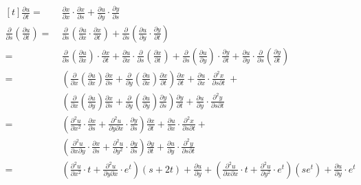 $\begin{aligned}[t]
    \frac{\partial u}{\partial t} 
    =&~ \frac{\partial x}{\partial x} \cdot \frac{\partial x}{\partial s} + \frac{\partial u}{\partial y} \cdot \frac{\partial y}{\partial s} \\
    \frac{\partial}{\partial s} \left( \frac{\partial u}{\partial t} \right) 
    =&~ \frac{\partial}{\partial s} \left( \frac{\partial u}{\partial x} \cdot \frac{\partial x}{\partial t} \right) + \frac{\partial}{\partial s} \left( \frac{\partial u}{\partial y} \cdot \frac{\partial y}{\partial t} \right) \\
    =&~ \frac{\partial}{\partial s} \left( \frac{\partial u}{\partial x} \right) \cdot \frac{\partial x}{\partial t} + \frac{\partial u}{\partial x} \cdot \frac{\partial}{\partial s} \left( \frac{\partial x}{\partial t} \right) + \frac{\partial}{\partial s} \left( \frac{\partial u}{\partial y} \right) \cdot \frac{\partial y}{\partial t} + \frac{\partial u}{\partial y} \cdot \frac{\partial}{\partial s} \left( \frac{\partial y}{\partial t} \right) \\
    =&~ \left( \frac{\partial}{\partial x} \left( \frac{\partial u}{\partial x} \right) \frac{\partial x}{\partial s} + \frac{\partial}{\partial y} \left( \frac{\partial u}{\partial x} \right) \frac{\partial x}{\partial t} \right) \frac{\partial x}{\partial t} + \frac{\partial u}{\partial x} \cdot \frac{\partial^2 x}{\partial s \partial t} ~+ \\ &~ \left( \frac{\partial}{\partial x} \left( \frac{\partial u}{\partial y} \right) \frac{\partial x}{\partial s} + \frac{\partial}{\partial y} \left( \frac{\partial u}{\partial y} \right) \frac{\partial y}{\partial s} \right) \frac{\partial y}{\partial t} + \frac{\partial u}{\partial y} \cdot \frac{\partial^2 y}{\partial s \partial t} \\
    =&~ \left( \frac{\partial^2 u}{\partial x^2} \cdot \frac{\partial x}{\partial s} + \frac{\partial ^2 u}{\partial y \partial x} \cdot \frac{\partial y}{\partial s} \right) \frac{\partial x}{\partial t} + \frac{\partial u}{\partial x} \cdot \frac{\partial^2 x}{\partial s \partial t} + \\ &~ \left( \frac{\partial^2 u}{\partial x \partial y} \cdot \frac{\partial x}{\partial s} + \frac{\partial^2 u}{\partial y^2} \cdot \frac{\partial y}{\partial s} \right) \frac{\partial y}{\partial t} + \frac{\partial u}{\partial y} \cdot \frac{\partial^2 y}{\partial s \partial t} \\
    =&~ \left( \frac{\partial^2 u}{\partial x^2} \cdot t + \frac{\partial^2 u}{\partial y \partial x} \cdot e^t \right) (s + 2t) + \frac{\partial u}{\partial y} + \left( \frac{\partial^2 u}{\partial x \partial x} \cdot t + \frac{\partial^2 u}{\partial y^2} \cdot e^t \right) (se^t) + \frac{\partial u}{\partial y} \cdot e^t
\end{aligned}$

